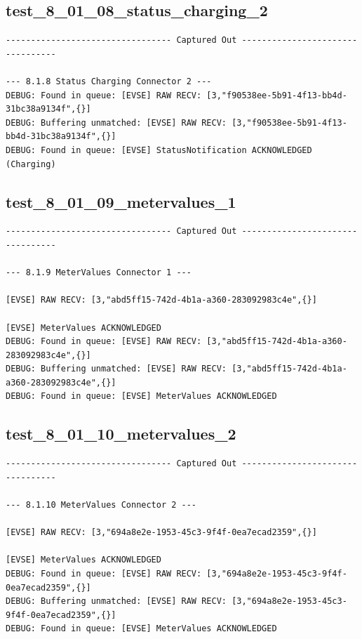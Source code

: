 \documentclass{article}
\begin{document}
\subsection*{test\_8\_01\_08\_status\_charging\_2}
\begin{lstlisting}
--------------------------------- Captured Out ---------------------------------

--- 8.1.8 Status Charging Connector 2 ---
DEBUG: Found in queue: [EVSE] RAW RECV: [3,"f90538ee-5b91-4f13-bb4d-31bc38a9134f",{}]
DEBUG: Buffering unmatched: [EVSE] RAW RECV: [3,"f90538ee-5b91-4f13-bb4d-31bc38a9134f",{}]
DEBUG: Found in queue: [EVSE] StatusNotification ACKNOWLEDGED (Charging)
\end{lstlisting}
\subsection*{test\_8\_01\_09\_metervalues\_1}
\begin{lstlisting}
--------------------------------- Captured Out ---------------------------------

--- 8.1.9 MeterValues Connector 1 ---

[EVSE] RAW RECV: [3,"abd5ff15-742d-4b1a-a360-283092983c4e",{}]

[EVSE] MeterValues ACKNOWLEDGED
DEBUG: Found in queue: [EVSE] RAW RECV: [3,"abd5ff15-742d-4b1a-a360-283092983c4e",{}]
DEBUG: Buffering unmatched: [EVSE] RAW RECV: [3,"abd5ff15-742d-4b1a-a360-283092983c4e",{}]
DEBUG: Found in queue: [EVSE] MeterValues ACKNOWLEDGED
\end{lstlisting}
\subsection*{test\_8\_01\_10\_metervalues\_2}
\begin{lstlisting}
--------------------------------- Captured Out ---------------------------------

--- 8.1.10 MeterValues Connector 2 ---

[EVSE] RAW RECV: [3,"694a8e2e-1953-45c3-9f4f-0ea7ecad2359",{}]

[EVSE] MeterValues ACKNOWLEDGED
DEBUG: Found in queue: [EVSE] RAW RECV: [3,"694a8e2e-1953-45c3-9f4f-0ea7ecad2359",{}]
DEBUG: Buffering unmatched: [EVSE] RAW RECV: [3,"694a8e2e-1953-45c3-9f4f-0ea7ecad2359",{}]
DEBUG: Found in queue: [EVSE] MeterValues ACKNOWLEDGED
\end{lstlisting}
\end{document}
